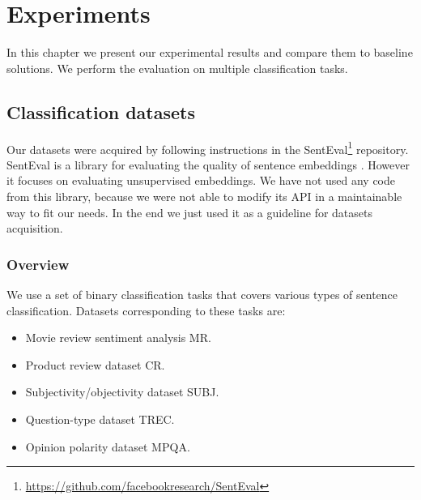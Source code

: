 \chapter{Experiments}

In this chapter we present our experimental results and compare them to baseline solutions.
We perform the evaluation on multiple classification tasks. 

\section{Classification datasets}
    
    Our datasets were acquired by following instructions in the SentEval\footnote{\url{https://github.com/facebookresearch/SentEval}} repository.
    SentEval is a library for evaluating the quality of sentence embeddings \cite{conneau2017supervised}. 
    However it focuses on evaluating unsupervised embeddings.
    We have not used any code from this library, because we were not able to modify its API in a maintainable way to fit our needs. 
    In the end we just used it as a guideline for datasets acquisition.
    
    \subsection{Overview} \label{sec:data:overview}
    We use a set of binary classification tasks that covers various types of sentence classification.
    Datasets corresponding to these tasks are:
    \begin{itemize}
        \item Movie review sentiment analysis MR.
        \item Product review dataset CR.
        \item Subjectivity/objectivity dataset SUBJ.
        \item Question-type dataset TREC.
        \item Opinion polarity dataset MPQA.
    \end{itemize}
    

